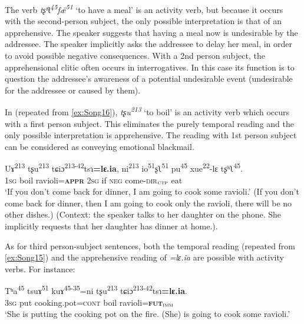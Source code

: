 \documentclass[output=paper,colorlinks,citecolor=brown, language=chinese]{langscibook}
\begin{document}
\noindent The verb \textit{tʂʰʅ\textsuperscript{45}f\~æ\textsuperscript{51}} `to have a meal' is an activity verb, but because it occurs with the second-person subject, the only possible interpretation is that of an apprehensive. The speaker suggests that having a meal now is undesirable by the addressee. The speaker implicitly asks the addressee to delay her meal, in order to avoid possible negative consequences. With a 2nd person subject, the apprehensional clitic often occurs in interrogatives. In this case its function is to question the addressee's awareness of a potential undesirable event (undesirable for the addressee or caused by them).


In  (repeated from \ref{ex:Song16}), \textit{tʂu\textsuperscript{213}} `to boil' is an activity verb which occurs with a first person subject. This eliminates the purely temporal reading and the only possible interpretation is apprehensive. The reading with 1st person subject can be considered as conveying emotional blackmail. 

\ea\label{ex:Song35} %
\gll Uɤ\textsuperscript{213} tʂu\textsuperscript{213} tɕiɔ\textsuperscript{213-42}tsɿ\textbf{=lɛ.ia}, ni\textsuperscript{213} io\textsuperscript{51}ʂʅ\textsuperscript{51} pu\textsuperscript{45} xue\textsuperscript{22}-lɛ tʂʰʅ\textsuperscript{45}. \\
\textsc{1sg} boil ravioli=\textsc{\textbf{appr}} \textsc{2sg} if \textsc{neg} come-\textsc{dir$_{\textsc{ctp}}$} eat \\
\glt `If you don't come back for dinner, I am going to cook some ravioli.' (If you don't come back for dinner, then I am going to cook only the ravioli, there will be no other dishes.) (Context: the speaker talks to her daughter on the phone. She implicitly requests that her daughter has dinner at home.).
\z

As for third person-subject sentences, both the temporal reading  (repeated from \ref{ex:Song15}) and the apprehensive  reading of \textit{=lɛ.ia} are possible with activity verbs. For instance:

\ea\label{ex:Song37} %
\gll Tʰa\textsuperscript{45} tsuɤ\textsuperscript{51} kuɤ\textsuperscript{45-35}=ni tʂu\textsuperscript{213} tɕiɔ\textsuperscript{213-42}tsɿ\textbf{=lɛ.ia}. \\
\textsc{3sg} put cooking.pot=\textsc{cont} boil ravioli=\textsc{\textbf{fut$_{\textsc{imm}}$}} \\
\glt `She is putting the cooking pot on the fire. (She) is going to cook some ravioli.'
\z
\end{document}
